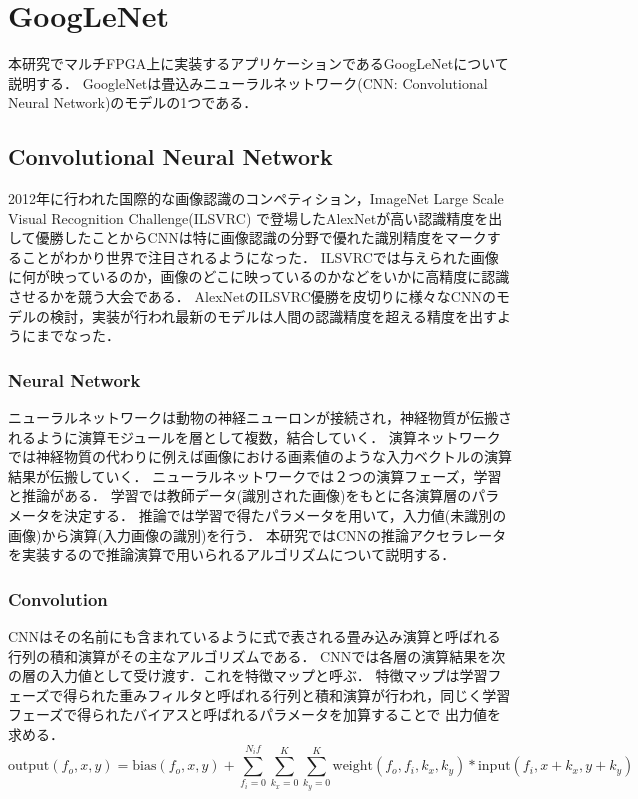 \chapter{GoogLeNet}
{
\label{chap:googlenet}
本研究でマルチFPGA上に実装するアプリケーションであるGoogLeNet\cite{googlenet}について説明する．
GoogleNetは畳込みニューラルネットワーク(CNN: Convolutional Neural Network)のモデルの1つである．

\section{Convolutional Neural Network}
\label{sec:cnn}
2012年に行われた国際的な画像認識のコンペティション，ImageNet Large Scale Visual Recognition Challenge(ILSVRC)
で登場したAlexNet\cite{alexnet}が高い認識精度を出して優勝したことからCNNは特に画像認識の分野で優れた識別精度をマークすることがわかり世界で注目されるようになった．
ILSVRCでは与えられた画像に何が映っているのか，画像のどこに映っているのかなどをいかに高精度に認識させるかを競う大会である．
AlexNetのILSVRC優勝を皮切りに様々なCNNのモデルの検討，実装が行われ最新のモデルは人間の認識精度を超える精度を出すようにまでなった．

\subsection{Neural Network}
\label{sec:nn}
ニューラルネットワークは動物の神経ニューロンが接続され，神経物質が伝搬されるように演算モジュールを層として複数，結合していく．
演算ネットワークでは神経物質の代わりに例えば画像における画素値のような入力ベクトルの演算結果が伝搬していく．
ニューラルネットワークでは２つの演算フェーズ，学習と推論がある．
学習では教師データ(識別された画像)をもとに各演算層のパラメータを決定する．
推論では学習で得たパラメータを用いて，入力値(未識別の画像)から演算(入力画像の識別)を行う．
本研究ではCNNの推論アクセラレータを実装するので推論演算で用いられるアルゴリズムについて説明する．

\subsection{Convolution}
\label{sec:conv}
CNNはその名前にも含まれているように式で表される畳み込み演算と呼ばれる行列の積和演算がその主なアルゴリズムである．
CNNでは各層の演算結果を次の層の入力値として受け渡す．これを特徴マップと呼ぶ．
特徴マップは学習フェーズで得られた重みフィルタと呼ばれる行列と積和演算が行われ，同じく学習フェーズで得られたバイアスと呼ばれるパラメータを加算することで
出力値を求める．
\begin{equation}
  \label{eq:conv}
	\mathrm{output}(f_o, x, y) = \mathrm{bias}(f_o, x, y) + \sum_{f_i = 0}^{N_if}\sum_{k_x = 0}^{K}\sum_{k_y = 0}^{K}\mathrm{weight}(f_o, f_i,k_x,k_y) * \mathrm{input}(f_i,x + k_x, y + k_y)
\end{equation}

}
